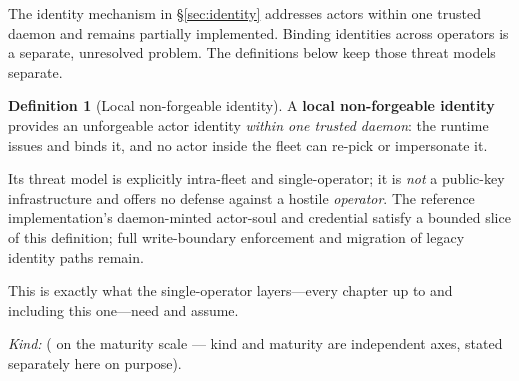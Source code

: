 \documentclass[11pt,a4paper]{article}
\theoremstyle{definition}
\newtheorem{definition}{Definition}[section]
\begin{document}
The identity mechanism in \S\ref{sec:identity} addresses actors within one
trusted daemon and remains partially implemented. Binding identities across
operators is a separate, unresolved problem. The definitions below keep those
threat models separate.

\begin{definition}[Local non-forgeable identity]\label{def:0040}
\setlength{\parskip}{4pt plus 1pt}
A \textbf{local non-forgeable identity} provides an unforgeable actor identity
\emph{within one trusted daemon}: the runtime issues and binds it, and no actor
inside the fleet can re-pick or impersonate it. 

Its threat model is explicitly
intra-fleet and single-operator; it is \emph{not} a public-key infrastructure and
offers no defense against a hostile \emph{operator}. The reference implementation's
daemon-minted actor-soul and credential satisfy a bounded slice of this definition;
full write-boundary enforcement and migration of legacy identity paths remain.


This is exactly what the single-operator layers---every chapter up to and
including this one---need and assume.


\emph{Kind:} \DesignInvariantKind{} (\BUILTWEAK{} on the maturity scale --- kind and
maturity are independent axes, stated separately here on purpose).
\end{definition}
\end{document}
